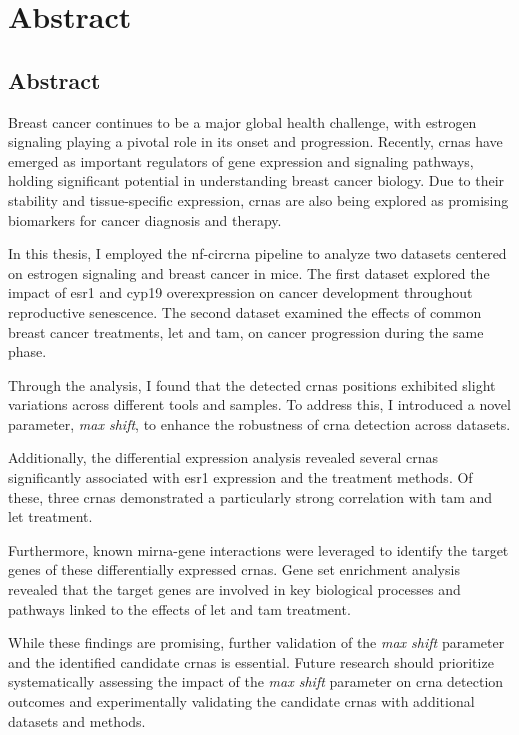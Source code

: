 \chapter{Abstract}

\section{Abstract}
Breast cancer continues to be a major global health challenge, with estrogen
signaling playing a pivotal role in its onset and progression.
Recently, \glspl{crna} have emerged as important regulators of gene expression
and signaling pathways, holding significant potential in understanding breast
cancer biology.
Due to their stability and tissue-specific expression, \glspl{crna} are also
being explored as promising biomarkers for cancer diagnosis and therapy.

In this thesis, I employed the \gls{nf-circrna} pipeline to analyze two
datasets centered on estrogen signaling and breast cancer in mice.
The first dataset explored the impact of \gls{esr1} and \gls{cyp19}
overexpression on cancer development throughout reproductive senescence.
The second dataset examined the effects of common breast cancer treatments,
\gls{let} and \gls{tam}, on cancer progression during the same phase.

Through the analysis, I found that the detected \glspl{crna} positions
exhibited slight variations across different tools and samples.
To address this, I introduced a novel parameter, \textit{max shift}, to enhance
the robustness of \gls{crna} detection across datasets.

Additionally, the differential expression analysis revealed several
\glspl{crna} significantly associated with \gls{esr1} expression and the
treatment methods.
Of these, three \glspl{crna} demonstrated a particularly strong correlation
with \gls{tam} and \gls{let} treatment.

Furthermore, known \gls{mirna}-gene interactions were leveraged to identify the
target genes of these differentially expressed \glspl{crna}.
Gene set enrichment analysis revealed that the target genes are involved in key
biological processes and pathways linked to the effects of \gls{let} and
\gls{tam} treatment.

While these findings are promising, further validation of the \textit{max
    shift} parameter and the identified candidate \glspl{crna} is essential.
Future research should prioritize systematically assessing the impact of the
\textit{max shift} parameter on \gls{crna} detection outcomes and
experimentally validating the candidate \glspl{crna} with additional datasets
and methods.

